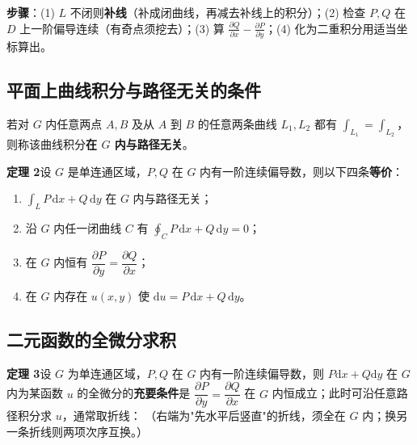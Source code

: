 \textbf{步骤}：(1) $L$ 不闭则\textbf{补线}（补成闭曲线，再减去补线上的积分）；(2) 检查 $P,Q$ 在 $D$ 上一阶偏导连续（有奇点须挖去）；(3) 算 $\frac{\partial Q}{\partial x}-\frac{\partial P}{\partial y}$；(4) 化为二重积分用适当坐标算出。


\subsection{平面上曲线积分与路径无关的条件}

若对 $G$ 内任意两点 $A,B$ 及从 $A$ 到 $B$ 的任意两条曲线 $L_1,L_2$ 都有 $\int_{L_1}=\int_{L_2}$，则称该曲线积分\textbf{在 $G$ 内与路径无关}。

\textbf{定理 2}\quad 设 $G$ 是单连通区域，$P,Q$ 在 $G$ 内有一阶连续偏导数，则以下四条\textbf{等价}：

\begin{enumerate}
  \item $\int_LP\,\mathrm{d}x+Q\,\mathrm{d}y$ 在 $G$ 内与路径无关；
  \item 沿 $G$ 内任一闭曲线 $C$ 有 $\oint_CP\,\mathrm{d}x+Q\,\mathrm{d}y=0$；
  \item 在 $G$ 内恒有 $\dfrac{\partial P}{\partial y}=\dfrac{\partial Q}{\partial x}$；
  \item 在 $G$ 内存在 $u(x,y)$ 使 $\mathrm{d}u=P\,\mathrm{d}x+Q\,\mathrm{d}y$。
\end{enumerate}


\subsection{二元函数的全微分求积}

\textbf{定理 3}\quad 设 $G$ 为单连通区域，$P,Q$ 在 $G$ 内有一阶连续偏导数，则 $P\mathrm{d}x+Q\mathrm{d}y$ 在 $G$ 内为某函数 $u$ 的全微分的\textbf{充要条件}是 $\dfrac{\partial P}{\partial y}=\dfrac{\partial Q}{\partial x}$ 在 $G$ 内恒成立；此时可沿任意路径积分求 $u$，通常取折线：
（右端为"先水平后竖直"的折线，须全在 $G$ 内；换另一条折线则两项次序互换。）


